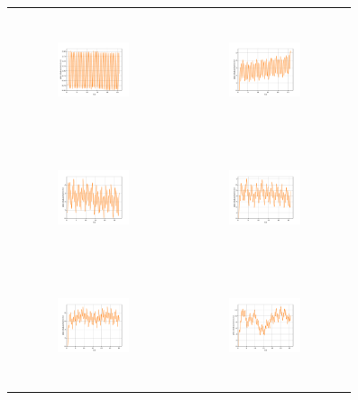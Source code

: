\begin{figure}[H]
\begin{center}
\begin{tabular}{cc}
\includegraphics[width=0.45\textwidth, height=3.5cm]{graph/omega=3.00_A=1_plate.pdf}
&
\includegraphics[width=0.45\textwidth, height=3.5cm]{graph/omega=3.00_A=2_plate.pdf}\\
\includegraphics[width=0.45\textwidth, height=3.5cm]{graph/omega=3.00_A=3_plate.pdf}
&
\includegraphics[width=0.45\textwidth, height=3.5cm]{graph/omega=3.00_A=4_plate.pdf}\\
\includegraphics[width=0.45\textwidth, height=3.5cm]{graph/omega=3.00_A=5_plate.pdf}
&
\includegraphics[width=0.45\textwidth, height=3.5cm]{graph/omega=3.00_A=6_plate.pdf}\\

\end{tabular}
\end{center}
\end{figure}
